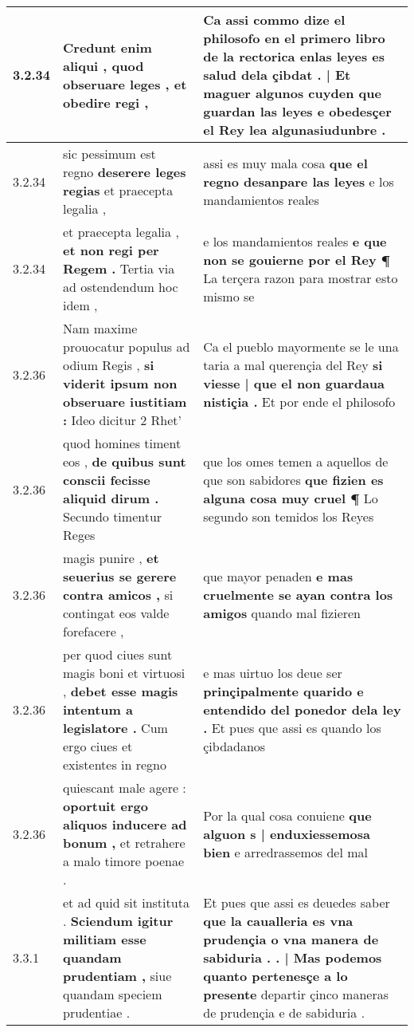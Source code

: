 \begin{tabular}{|p{1cm}|p{6.5cm}|p{6.5cm}|}
3.2.34 & Credunt enim aliqui , \textbf{ quod obseruare leges , } et obedire regi , & Ca assi commo dize el philosofo \textbf{ en el primero libro de la rectorica enlas leyes es salud dela çibdat . | Et maguer algunos cuyden que guardan las leyes } e obedesçer el Rey lea algunasiudunbre . \\\hline
3.2.34 & sic pessimum est regno \textbf{ deserere leges regias } et praecepta legalia , & assi es muy mala cosa \textbf{ que el regno desanpare las leyes } e los mandamientos reales \\\hline
3.2.34 & et praecepta legalia , \textbf{ et non regi per Regem . } Tertia via ad ostendendum hoc idem , & e los mandamientos reales \textbf{ e que non se gouierne por el Rey ¶ } La terçera razon para mostrar esto mismo se \\\hline
3.2.36 & Nam maxime prouocatur populus ad odium Regis , \textbf{ si viderit ipsum non obseruare iustitiam : } Ideo dicitur 2 Rhet’ & Ca el pueblo mayormente se le una taria a mal querençia del Rey \textbf{ si viesse | que el non guardaua nistiçia . } Et por ende el philosofo \\\hline
3.2.36 & quod homines timent eos , \textbf{ de quibus sunt conscii fecisse aliquid dirum . } Secundo timentur Reges & que los omes temen a aquellos de que son sabidores \textbf{ que fizien es alguna cosa muy cruel ¶ } Lo segundo son temidos los Reyes \\\hline
3.2.36 & magis punire , \textbf{ et seuerius se gerere contra amicos , } si contingat eos valde forefacere , & que mayor penaden \textbf{ e mas cruelmente se ayan contra los amigos } quando mal fizieren \\\hline
3.2.36 & per quod ciues sunt magis boni et virtuosi , \textbf{ debet esse magis intentum a legislatore . } Cum ergo ciues et existentes in regno & e mas uirtuo los deue ser \textbf{ prinçipalmente quarido e entendido del ponedor dela ley . } Et pues que assi es quando los çibdadanos \\\hline
3.2.36 & quiescant male agere : \textbf{ oportuit ergo aliquos inducere ad bonum , } et retrahere a malo timore poenae . & Por la qual cosa conuiene \textbf{ que alguon s | enduxiessemosa bien } e arredrassemos del mal \\\hline
3.3.1 & et ad quid sit instituta . \textbf{ Sciendum igitur militiam esse quandam prudentiam , } siue quandam speciem prudentiae . & Et pues que assi es deuedes saber \textbf{ que la caualleria es vna prudençia o vna manera de sabiduria . . | Mas podemos quanto pertenesçe a lo presente } departir çinco maneras de prudençia e de sabiduria . \\\hline

\end{tabular}
